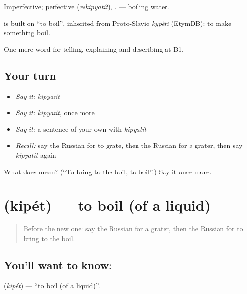 Imperfective; perfective \emph{} (\emph{vskipyatít}), \emph{}. \emph{} — boiling water.

\begin{cousinweb}
\emph{} is built on \emph{} \textquotedblleft{}to boil\textquotedblright{}, inherited from Proto-Slavic \emph{kypěti} (EtymDB): to make something boil.
\end{cousinweb}

\begin{grammarlens}[title={What you've built}]
One more word for telling, explaining and describing at B1.
\end{grammarlens}

\subsection*{Your turn}
\begin{itemize}
\raggedright
  \item \emph{Say it:} \emph{kipyatít}
  \item \emph{Say it:} \emph{kipyatít}, once more
  \item \emph{Say it:} a sentence of your own with \emph{kipyatít}
  \item \emph{Recall:} say the Russian for to grate, then the Russian for a grater, then say \emph{kipyatít} again
\end{itemize}

\begin{tcolorbox}[breakable,colback=teal!4,colframe=teal!35!black,title={Before you move on}]
What does  mean? (\textquotedblleft{}To bring to the boil, to boil\textquotedblright{}.) Say it once more.
\end{tcolorbox}
\section[\texorpdfstring{\ru{кипеть} (kipét)}{кипеть (kipét)}]{ (kipét) — to boil (of a liquid)}

\label{lesson:RU-C329-kipet}



\begin{quote}
Before the new one: say the Russian for a grater, then the Russian for to bring to the boil.
\end{quote}

\subsection*{You'll want to know: }
\textbf{} (\emph{kipét}) — \textquotedblleft{}to boil (of a liquid)\textquotedblright{}.

